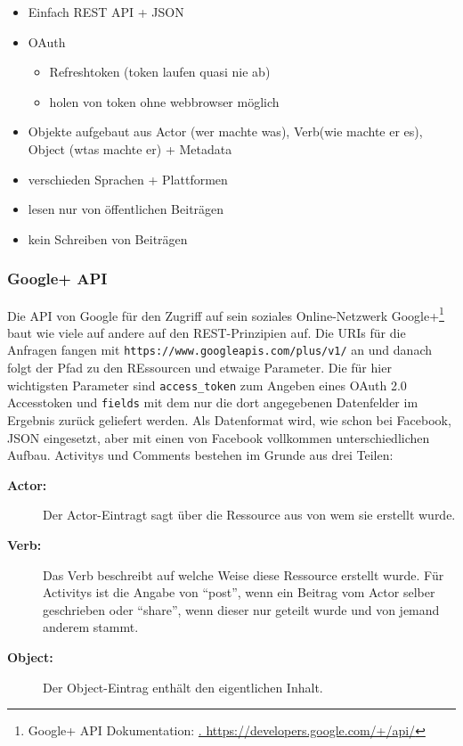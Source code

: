 \begin{itemize}
    \item Einfach REST API + JSON
    \item OAuth
    \begin{itemize}
        \item Refreshtoken (token laufen quasi nie ab)
        \item holen von token ohne webbrowser möglich
    \end{itemize}
    \item Objekte aufgebaut aus Actor (wer machte was), Verb(wie machte er es), Object (wtas machte er) + Metadata
    \item verschieden Sprachen + Plattformen
    \item lesen nur von öffentlichen Beiträgen
    \item kein Schreiben von Beiträgen
\end{itemize}

\subsubsection{Google+ API} %
\label{ssub:google_api}

Die API von Google für den Zugriff auf sein soziales Online-Netzwerk Google+\footnote{Google+ API Dokumentation: \url{. https://developers.google.com/+/api/}} baut wie viele auf andere auf den REST-Prinzipien auf. Die URIs für die Anfragen fangen mit \texttt{https://www.googleapis.com/plus/v1/} an und danach folgt der Pfad zu den REssourcen und etwaige Parameter. Die für hier wichtigsten Parameter sind \texttt{access\_token} zum Angeben eines OAuth 2.0 Accesstoken und \texttt{fields} mit dem nur die dort angegebenen Datenfelder im Ergebnis zurück geliefert werden. Als Datenformat wird, wie schon bei Facebook, JSON eingesetzt, aber mit einen von Facebook vollkommen unterschiedlichen Aufbau. Activitys und Comments bestehen im Grunde aus drei Teilen:

\begin{description}
    \item[\textbf{Actor:}] Der Actor-Eintragt sagt über die Ressource aus von wem sie erstellt wurde. 
    \item[\textbf{Verb:}] Das Verb beschreibt auf welche Weise diese Ressource erstellt wurde. Für Activitys ist die Angabe von \enquote{post}, wenn ein Beitrag vom Actor selber geschrieben oder \enquote{share}, wenn dieser nur geteilt wurde und von jemand anderem stammt. 
    \item[\textbf{Object:}] Der Object-Eintrag enthält den eigentlichen Inhalt.
\end{description}

